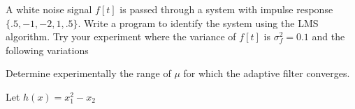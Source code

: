 \documentclass{homework}
\begin{document}
\begin{problem}[14-15]
  A white noise signal $f[t]$ is passed through a system with impulse response $\{.5, -1, -2, 1, .5\}$. Write a program to identify the system using the LMS algorithm. Try your experiment where the variance of $f[t]$ is $\sigma_f^2 = 0.1$ and the following variations
  Determine experimentally the range of $\mu$ for which the adaptive filter converges.
\end{problem}

\begin{solution}
     
\end{solution}

\begin{problem}[18-2a]
  Let $h(x) = x_1^2 - x_2$ 
\end{problem}

\begin{solution}
  
\end{solution}
\end{document}
